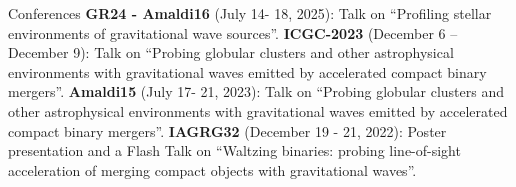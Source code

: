\begin{rubric}{Conferences}
\entry*[] \textbf{GR24 - Amaldi16} (July 14- 18, 2025): Talk on ``Profiling stellar environments of gravitational wave sources''.
%
\entry*[] \textbf{ICGC-2023} (December 6 – December 9): Talk on ``Probing globular clusters and other astrophysical environments with gravitational waves emitted by accelerated compact binary mergers''.
%
\entry*[] \textbf{Amaldi15} (July 17- 21, 2023): Talk on ``Probing globular clusters and other astrophysical environments with gravitational waves emitted by accelerated compact binary mergers''.
%
\entry*[] \textbf{IAGRG32} (December 19 - 21, 2022): Poster presentation and a Flash Talk on ``Waltzing binaries: probing line-of-sight acceleration of merging compact objects with gravitational waves''.
%

\end{rubric}